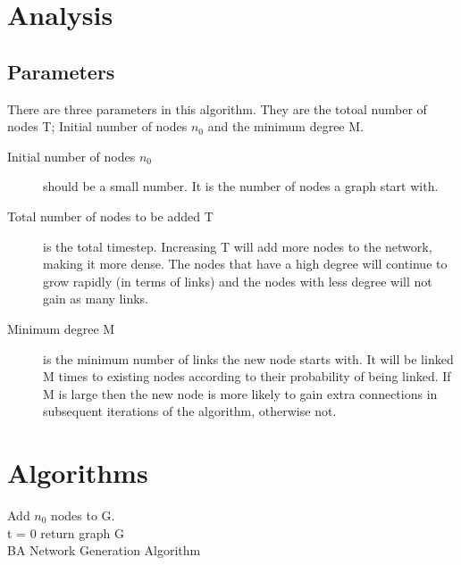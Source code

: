 \documentclass[a0,final]{a0poster}
\begin{document}
\begin{multicols}{3}
\section{Analysis}
\subsection{Parameters}
There are three parameters in this algorithm. They are the totoal number of nodes T;  Initial number of nodes $n_0$ and the minimum degree M. \\
\begin{description} 
  \item[Initial number of nodes $n_0$] should be a small number. It is the number of nodes a graph start with.
  \item[Total number of nodes to be added T] is the total timestep. Increasing T will add more nodes to the network, making it more dense. The nodes that have a high degree will continue to grow rapidly (in terms of links) and the nodes with less degree will not gain as many links.
  \item[Minimum degree M] is the minimum number of links the new node starts with. It will be linked M times to existing nodes according to their probability of being linked. If M is large then the new node is more likely to gain extra connections in subsequent iterations of the algorithm, otherwise not.
\end{description}

\columnbreak

\section*{Algorithms}


\begin{algorithm}[H]
Add $n_0$ nodes to G.\\
t = 0
return graph G\\
 \caption{BA Network Generation Algorithm}
\end{algorithm}




\end{multicols}
\end{document}
